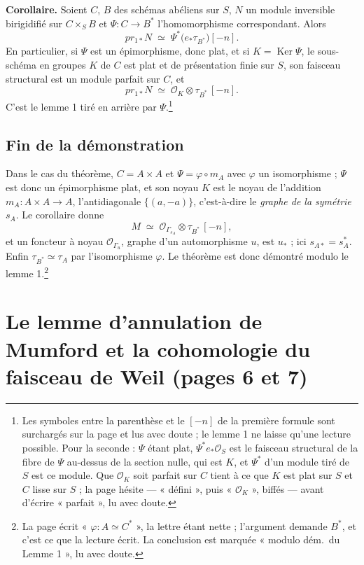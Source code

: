 \documentclass[11pt,a4paper]{article}
\begin{document}
\textbf{Corollaire.} Soient $C$, $B$ des schémas abéliens sur $S$, $N$ un
module inversible birigidifié sur $C \times_S B$ et $\Psi \colon C \to B^{*}$
l'homomorphisme correspondant. Alors
\[
  pr_{1*}N \;\simeq\; \Psi^{*}\bigl(e_{*}\tau_{B^{*}}\bigr)[-n].
\]
En particulier, si $\Psi$ est un épimorphisme, donc plat, et si $K =
\operatorname{Ker}\Psi$, le sous-schéma en groupes $K$ de $C$ est plat et de
présentation finie sur $S$, son faisceau structural est un module parfait sur
$C$, et
\[
  pr_{1*}N \;\simeq\; \mathcal{O}_K \otimes \tau_{B^{*}}\,[-n].
\]
C'est le lemme 1 tiré en arrière par $\Psi$.\footnote{Les symboles entre la parenthèse et le $[-n]$ de la première formule
sont surchargés sur la page et lus avec doute ; le lemme 1 ne laisse qu'une
lecture possible. Pour la seconde : $\Psi$ étant plat, $\Psi^{*}e_{*}
\mathcal{O}_S$ est le faisceau structural de la fibre de $\Psi$ au-dessus de
la section nulle, qui est $K$, et $\Psi^{*}$ d'un module tiré de $S$ est ce
module. Que $\mathcal{O}_K$ soit parfait sur $C$ tient à ce que $K$ est plat
sur $S$ et $C$ lisse sur $S$ ; la page hésite — « défini », puis
« $\mathcal{O}_K$ », biffés — avant d'écrire « parfait », lu avec doute.}

\subsection*{Fin de la démonstration}

Dans le cas du théorème, $C = A \times A$ et $\Psi = \varphi \circ m_A$ avec
$\varphi$ un isomorphisme ; $\Psi$ est donc un épimorphisme plat, et son noyau
$K$ est le noyau de l'addition $m_A \colon A \times A \to A$, l'antidiagonale
$\{(a, -a)\}$, c'est-à-dire le \emph{graphe de la symétrie} $s_A$. Le
corollaire donne
\[
  M \;\simeq\; \mathcal{O}_{\Gamma_{s_A}} \otimes \tau_{B^{*}}\,[-n],
\]
et un foncteur à noyau $\mathcal{O}_{\Gamma_u}$, graphe d'un automorphisme
$u$, est $u_{*}$ ; ici $s_{A*} = s_A^{*}$. Enfin $\tau_{B^{*}} \simeq \tau_A$
par l'isomorphisme $\varphi$. Le théorème est donc démontré modulo le
lemme 1.\footnote{La page écrit « $\varphi \colon A \simeq C^{*}$ », la
lettre étant nette ; l'argument demande $B^{*}$, et c'est ce que la lecture
écrit. La conclusion est marquée « modulo dém.\ du Lemme 1 », lu avec doute.}

\section*{Le lemme d'annulation de Mumford et la cohomologie du faisceau de Weil (pages 6 et 7)}
\end{document}
